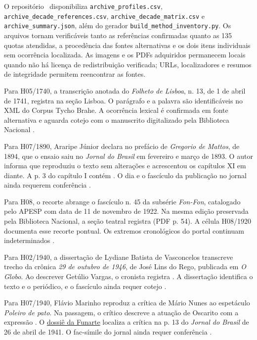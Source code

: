 O repositório \repo\ disponibiliza \nolinkurl{archive_profiles.csv}, \nolinkurl{archive_decade_references.csv}, \nolinkurl{archive_decade_matrix.csv} e \nolinkurl{archive_summary.json}, além do gerador \nolinkurl{build_method_inventory.py}. Os arquivos tornam verificáveis tanto as referências confirmadas quanto as 135 quotas atendidas, a procedência das fontes alternativas e os dois itens individuais sem ocorrência localizada. As imagens e os PDFs adquiridos permanecem locais quando não há licença de redistribuição verificada; URLs, localizadores e resumos de integridade permitem reencontrar as fontes.

Para H05/1740, a transcrição anotada do \textit{Folheto de Lisboa}, n. 13, de 1 de abril de 1741, registra  na seção Lisboa. O parágrafo e a palavra são identificáveis no XML do Corpus Tycho Brahe. A ocorrência lexical é confirmada em fonte alternativa e aguarda cotejo com o manuscrito digitalizado pela Biblioteca Nacional \cite{acervoD128}.

Para H07/1890, Araripe Júnior declara no prefácio de \textit{Gregorio de Mattos}, de 1894, que o ensaio saiu no \textit{Jornal do Brasil} em fevereiro e março de 1893. O autor informa que reproduziu o texto sem alterações e acrescentou os capítulos XI em diante. A p. 3 do capítulo I contém . O dia e o fascículo da publicação no jornal ainda requerem conferência \cite{acervoD129}.

Para H08, o recorte abrange o fascículo n. 45 da subsérie \textit{Fon-Fon}, catalogado pelo APESP com data de 11 de novembro de 1922. Na mesma edição preservada pela Biblioteca Nacional, a seção teatral registra  (PDF p. 54). A célula H08/1920 documenta esse recorte pontual. Os extremos cronológicos do portal continuam indeterminados \cite{acervoD130}.

Para H02/1940, a dissertação de Lydiane Batista de Vasconcelos transcreve trecho da crônica \textit{29 de outubro de 1946}, de José Lins do Rego, publicada em \textit{O Globo}. Ao descrever Getúlio Vargas, o cronista registra . A dissertação identifica o texto e o periódico, e o fascículo ainda requer cotejo \cite{acervoD131}.

Para H07/1940, Flávio Marinho reproduz a crítica de Mário Nunes ao espetáculo \textit{Poleiro de pato}. Na passagem, o crítico descreve a atuação de Oscarito com a expressão . O \href{https://atom.funarte.gov.br/index.php/poleiro-de-pato-revista}{dossiê da Funarte} localiza a crítica na p. 13 do \textit{Jornal do Brasil} de 26 de abril de 1941. O fac-símile do jornal ainda requer conferência \cite{acervoD132}.


